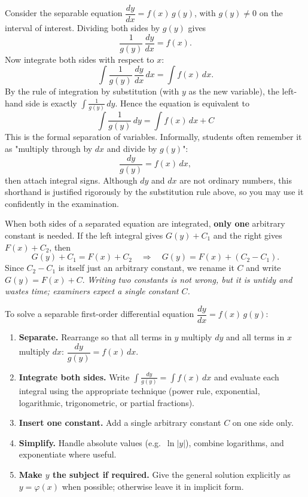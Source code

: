 \documentclass[11pt]{article}
\newcommand{\cle}[1]{{\popxbold\color{popdark}#1}}
\newcounter{popsec}
\newcounter{popsub}
\newcommand{\courssub}[1]{%
  \stepcounter{popsub}%
  \par\vspace{9pt}\noindent{\popxbold\fontsize{11.5}{13}\selectfont\color{popink}{\color{poporange}\thepopsec.\thepopsub}\hspace{6pt}#1}\par\nopagebreak\vspace{4pt}
}
\begin{document}
\courssub{The Principle of Separation}

Consider the separable equation $\dfrac{dy}{dx} = f(x)\,g(y)$, with $g(y) \neq 0$ on the interval of interest. Dividing both sides by $g(y)$ gives
\[
\frac{1}{g(y)}\,\frac{dy}{dx} = f(x).
\]
Now integrate both sides with respect to $x$:
\[
\int \frac{1}{g(y)}\,\frac{dy}{dx}\,dx = \int f(x)\,dx.
\]
By the rule of integration by substitution (with $y$ as the new variable), the left-hand side is exactly $\displaystyle\int \frac{1}{g(y)}\,dy$. Hence the equation is equivalent to
\[
\boxed{\ \int \frac{1}{g(y)}\,dy = \int f(x)\,dx + C\ }
\]
This is the \cle{formal separation} of variables. Informally, students often remember it as "multiply through by $dx$ and divide by $g(y)$":
\[
\frac{dy}{g(y)} = f(x)\,dx,
\]
then attach integral signs. Although $dy$ and $dx$ are not ordinary numbers, this shorthand is justified rigorously by the substitution rule above, so you may use it confidently in the examination.

\begin{propriete}
When both sides of a separated equation are integrated, \textbf{only one} arbitrary constant is needed. If the left integral gives $G(y) + C_1$ and the right gives $F(x) + C_2$, then
\[
G(y) + C_1 = F(x) + C_2 \quad\Longrightarrow\quad G(y) = F(x) + (C_2 - C_1).
\]
Since $C_2 - C_1$ is itself just an arbitrary constant, we rename it $C$ and write $G(y) = F(x) + C$. \emph{Writing two constants is not wrong, but it is untidy and wastes time; examiners expect a single constant $C$.}
\end{propriete}

\begin{methode}
To solve a separable first-order differential equation $\dfrac{dy}{dx} = f(x)\,g(y)$:
\begin{enumerate}
\item \textbf{Separate.} Rearrange so that all terms in $y$ multiply $dy$ and all terms in $x$ multiply $dx$: $\dfrac{dy}{g(y)} = f(x)\,dx$.
\item \textbf{Integrate both sides.} Write $\displaystyle\int \frac{dy}{g(y)} = \int f(x)\,dx$ and evaluate each integral using the appropriate technique (power rule, exponential, logarithmic, trigonometric, or partial fractions).
\item \textbf{Insert one constant.} Add a single arbitrary constant $C$ on one side only.
\item \textbf{Simplify.} Handle absolute values (e.g.\ $\ln|y|$), combine logarithms, and exponentiate where useful.
\item \textbf{Make $y$ the subject if required.} Give the general solution explicitly as $y = \varphi(x)$ when possible; otherwise leave it in implicit form.
\end{enumerate}
\end{methode}
\end{document}
